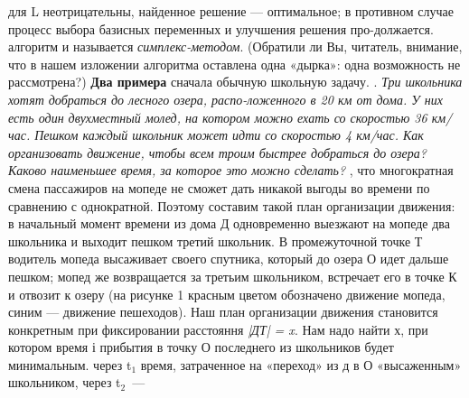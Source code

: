 \setcounter{page}{44}

\begin{multicols*}{2}

\vspace{0.5cm}
\noindent
для L неотрицательны, найденное решение — оптимальное;
в противном
случае процесс выбора базисных переменных и улучшения решения про-должается.
\newline{} алгоритм и называется  \textit{симплекс-методом}. (Обратили ли Вы, читатель, внимание, что в нашем изложении алгоритма оставлена одна «дырка»: одна возможность не рассмотрена?)
\newline
\newline\textbf{Два примера}
 сначала обычную школьную задачу. 
\newline{}. 
\textit{Три школьника хотят добраться до лесного озера, распо-ложенного в 20 км от дома. У них есть один двухместный молед, на котором можно ехать со скоростью 36 км/час. Пешком каждый школьник может идти со скоростью 4 км/час.
Как организовать движение, чтобы всем троим быстрее добраться до озера? Каково наименьшее время, за которое это можно сделать?}
\newline{}, что многократная смена пассажиров на мопеде не сможет дать никакой выгоды во времени по сравнению с однократной. Поэтому составим такой план организации движения: в начальный момент времени из дома Д одновременно выезжают на мопеде два школьника и выходит пешком третий школьник. В промежуточной точке Т водитель мопеда высаживает своего спутника, который до озера О идет дальше пешком; мопед же возвращается за третьим школьником, встречает его в точке К и отвозит к озеру (на рисунке 1 красным цветом обозначено движение мопеда, синим — движение пешеходов).
Наш план организации движения становится конкретным при фиксировании расстояння \textit{|ДТ| = x}. Нам надо найти х, при котором время і прибытия в точку О последнего из школьников будет минимальным.
\newline{} через t$_{1}$ время, затраченное на «переход» из д в О «высаженным» школьником, через t$_{2}$~---
\columnbreak


\end{multicols*}
